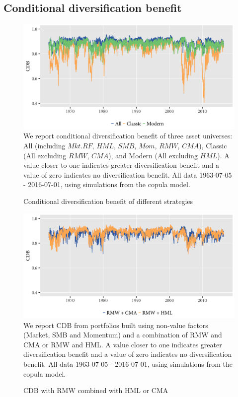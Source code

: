 \subsection{Conditional diversification benefit}
\begin{figure}[H]
  \caption{Conditional diversification benefit of different strategies}
  \label{diag:cdb1}
  \centering
  \begin{minipage}{\textwidth}
  \includegraphics[width=\textwidth]{graphics/cdb--modern-classic.png}  
  \vspace{3mm}
  \footnotesize
  We report conditional diversification benefit of three asset universes: All (including $Mkt.RF$, $HML$, $SMB$, $Mom$, $RMW$, $CMA$), Classic (All excluding $RMW$, $CMA$), and Modern (All excluding $HML$). A value closer to one indicates greater diversification benefit and a value of zero indicates no diversification benefit. All data 1963-07-05 - 2016-07-01, using simulations from the copula model.
  \end{minipage}
\end{figure}

\begin{figure}[H]
  \caption{CDB with RMW combined with HML or CMA}
  \label{diag:cdb--rmw_cma-rmw_hml}
  \centering
  \begin{minipage}{\textwidth}
  \includegraphics[width=\textwidth]{graphics/cdb--rmw_cma-rmw_hml.png}  
  \vspace{3mm}
  \footnotesize
  We report CDB from portfolios built using non-value factors (Market, SMB and Momentum) and a combination of RMW and CMA or RMW and HML. A value closer to one indicates greater diversification benefit and a value of zero indicates no diversification benefit. All data 1963-07-05 - 2016-07-01, using simulations from the copula model.
  \end{minipage}
\end{figure}

